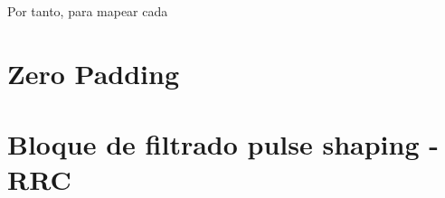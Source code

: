 \vspace{3mm}
		
Por tanto, para mapear cada 











\section{Zero Padding}




\section{Bloque de filtrado pulse shaping - RRC}




